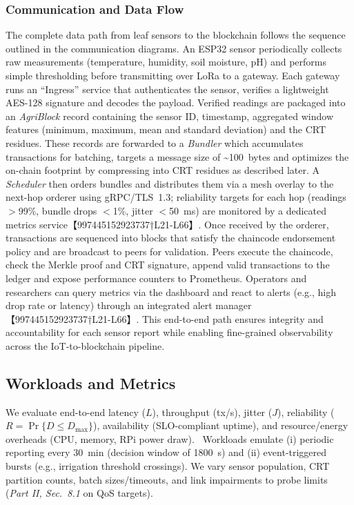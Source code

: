 \subsubsection{Communication and Data Flow}
The complete data path from leaf sensors to the blockchain follows the sequence outlined in the communication diagrams.  An ESP32 sensor periodically collects raw measurements (temperature, humidity, soil moisture, pH) and performs simple thresholding before transmitting over LoRa to a gateway.  Each gateway runs an ``Ingress'' service that authenticates the sensor, verifies a lightweight AES-128 signature and decodes the payload.  Verified readings are packaged into an \textit{AgriBlock} record containing the sensor ID, timestamp, aggregated window features (minimum, maximum, mean and standard deviation) and the CRT residues.  These records are forwarded to a \textit{Bundler} which accumulates transactions for batching, targets a message size of \textasciitilde{}100~bytes and optimizes the on-chain footprint by compressing into CRT residues as described later.  A \textit{Scheduler} then orders bundles and distributes them via a mesh overlay to the next-hop orderer using gRPC/TLS~1.3; reliability targets for each hop (readings $>$99\%, bundle drops $<$1\%, jitter $<$50~ms) are monitored by a dedicated metrics service【997445152923737†L21-L66】.  Once received by the orderer, transactions are sequenced into blocks that satisfy the chaincode endorsement policy and are broadcast to peers for validation.  Peers execute the chaincode, check the Merkle proof and CRT signature, append valid transactions to the ledger and expose performance counters to Prometheus.  Operators and researchers can query metrics via the dashboard and react to alerts (e.g., high drop rate or latency) through an integrated alert manager【997445152923737†L21-L66】.  This end-to-end path ensures integrity and accountability for each sensor report while enabling fine-grained observability across the IoT-to-blockchain pipeline.

\subsection{Workloads and Metrics}
We evaluate end-to-end latency ($L$), throughput (tx/s), jitter ($J$), reliability ($R=\Pr\{D\le D_{\max}\}$), availability (SLO-compliant uptime), and resource/energy overheads (CPU, memory, RPi power draw).\ %
Workloads emulate (i) periodic reporting every 30~min (decision window of 1800~s) and (ii) event-triggered bursts (e.g., irrigation threshold crossings). We vary sensor population, CRT partition counts, batch sizes/timeouts, and link impairments to probe limits (\emph{Part II, Sec.~8.1} on QoS targets).

